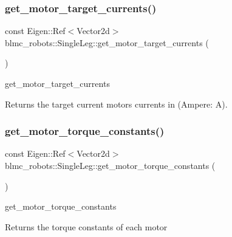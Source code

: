 \subsubsection{\texorpdfstring{get\+\_\+motor\+\_\+target\+\_\+currents()}{get\_motor\_target\_currents()}}
{\footnotesize\ttfamily const Eigen\+::\+Ref$<$Vector2d$>$ blmc\+\_\+robots\+::\+Single\+Leg\+::get\+\_\+motor\+\_\+target\+\_\+currents (\begin{DoxyParamCaption}{ }\end{DoxyParamCaption})\hspace{0.3cm}{\ttfamily [inline]}}



get\+\_\+motor\+\_\+target\+\_\+currents 

\begin{DoxyReturn}{Returns}
the target current motors currents in (Ampere\+: A). 
\end{DoxyReturn}
\mbox{\label{classblmc__robots_1_1SingleLeg_a402a4e609e17fb304a113cb5c434b7e3}} 
\subsubsection{\texorpdfstring{get\+\_\+motor\+\_\+torque\+\_\+constants()}{get\_motor\_torque\_constants()}}
{\footnotesize\ttfamily const Eigen\+::\+Ref$<$Vector2d$>$ blmc\+\_\+robots\+::\+Single\+Leg\+::get\+\_\+motor\+\_\+torque\+\_\+constants (\begin{DoxyParamCaption}{ }\end{DoxyParamCaption})\hspace{0.3cm}{\ttfamily [inline]}}



get\+\_\+motor\+\_\+torque\+\_\+constants 

\begin{DoxyReturn}{Returns}
the torque constants of each motor 
\end{DoxyReturn}
\mbox{\label{classblmc__robots_1_1SingleLeg_a11751bde3377207e56ded343e00a99f1}} 
